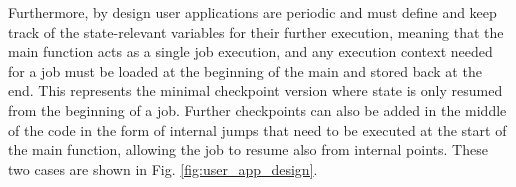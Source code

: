 Furthermore, by design user applications are periodic and must define and keep track of the state-relevant variables for their further execution, meaning that the main function acts as a single job execution, and any execution context needed for a job must be loaded at the beginning of the main and stored back at the end. This represents the minimal checkpoint version where state is only resumed from the beginning of a job. Further checkpoints can also be added in the middle of the code in the form of internal jumps that need to be executed at the start of the main function, allowing the job to resume also from internal points. These two cases are shown in Fig. \ref{fig:user_app_design}.

